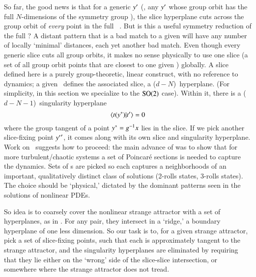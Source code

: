 


So far, the good news is that for a generic {\template} ${y'}$ (\ie,
any ${y'}$ whose group orbit has the full $N$-dimensions of the symmetry group
\Group), the slice hyperplane  cuts across the group orbit
of {\em every} point in the full \statesp\ \pS. But is this a useful
symmetry reduction of the full \statesp? A distant pattern that is a bad match
to a given {\template} will have any number of locally `minimal'
distances, each yet another bad match.
Even though every generic slice cuts all group orbits, it makes no sense
physically to use one slice (a set of all group orbit points that are
closest to one given {\template}) globally.
A slice
defined here is a purely group-theoretic, linear construct, with no
reference to dynamics; a given {\template} \slicep\ defines the
associated slice, a ($d\!-\!N$)\dmn\ hyperplane.
(For simplicity, in this section we specialize to the  $\textrm{SO}(2)$ case).
Within it, there is a
($d\!-\!N\!-1$)\dmn\ singularity hyperplane
\[
\braket{\groupTan(\sspRSing)}{\sliceTan{}}=0
\]
where the group tangent of a point $y^*=g^{-1} x$ lies in
the slice. If we pick another slice-fixing point ${y'}'$, it comes
along with its own slice and singularity hyperplane.
Work on \KS\ suggests how to
proceed: the main advance of
 was to show that for more
turbulent/chaotic systems a set of Poincar\'e sections is needed to
capture the dynamics. Sets of {\PoincSec}s are picked so each captures a
neighborhoods of an important, qualitatively distinct class of solutions
(2-rolls states, 3-rolls states). The choice should be `physical,'
dictated by the dominant patterns seen in the solutions of nonlinear
PDEs.

So idea is to
coarsely cover the nonlinear strange attractor with a set of hyperplanes,
as in . For any pair, they intersect in a
`ridge,' a
boundary hyperplane of one less dimension. So our task is to, for a
given strange attractor, pick a set of slice-fixing points, such that
each is approximately tangent to the strange attractor, and the
singularity hyperplanes are eliminated by requiring that they lie either
on the `wrong' side of the slice-slice intersection, or somewhere where
the strange attractor does not tread.

